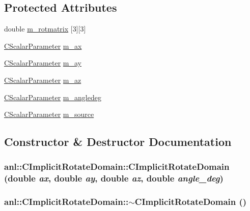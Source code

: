 \subsection*{Protected Attributes}
\begin{DoxyCompactItemize}
\item 
double \hyperlink{classanl_1_1CImplicitRotateDomain_a9bd8244857bad0dbe9c81095934b1fa1}{m\_\-rotmatrix} \mbox{[}3\mbox{]}\mbox{[}3\mbox{]}
\item 
\hyperlink{classanl_1_1CScalarParameter}{CScalarParameter} \hyperlink{classanl_1_1CImplicitRotateDomain_ac765432fbf7db6e3dbd6ebf4228ea649}{m\_\-ax}
\item 
\hyperlink{classanl_1_1CScalarParameter}{CScalarParameter} \hyperlink{classanl_1_1CImplicitRotateDomain_ad8e619dec8d0f14b4cd8924834d9f0fb}{m\_\-ay}
\item 
\hyperlink{classanl_1_1CScalarParameter}{CScalarParameter} \hyperlink{classanl_1_1CImplicitRotateDomain_aef2125375f4cd5a477cc69dad7750479}{m\_\-az}
\item 
\hyperlink{classanl_1_1CScalarParameter}{CScalarParameter} \hyperlink{classanl_1_1CImplicitRotateDomain_a08774fd24861ad6fe2f7b9afe4816b6e}{m\_\-angledeg}
\item 
\hyperlink{classanl_1_1CScalarParameter}{CScalarParameter} \hyperlink{classanl_1_1CImplicitRotateDomain_a9cfd7f532e1e1449e16707f37b7d083b}{m\_\-source}
\end{DoxyCompactItemize}


\subsection{Constructor \& Destructor Documentation}
\hypertarget{classanl_1_1CImplicitRotateDomain_a90c53e09c2018dc921a1ae128644bb7b}{
\subsubsection[{CImplicitRotateDomain}]{\setlength{\rightskip}{0pt plus 5cm}anl::CImplicitRotateDomain::CImplicitRotateDomain (double {\em ax}, \/  double {\em ay}, \/  double {\em az}, \/  double {\em angle\_\-deg})}}
\label{classanl_1_1CImplicitRotateDomain_a90c53e09c2018dc921a1ae128644bb7b}
\hypertarget{classanl_1_1CImplicitRotateDomain_a1b3be6e3c993c08310dffb8327cfbd3d}{
\subsubsection[{$\sim$CImplicitRotateDomain}]{\setlength{\rightskip}{0pt plus 5cm}anl::CImplicitRotateDomain::$\sim$CImplicitRotateDomain ()}}
\label{classanl_1_1CImplicitRotateDomain_a1b3be6e3c993c08310dffb8327cfbd3d}


